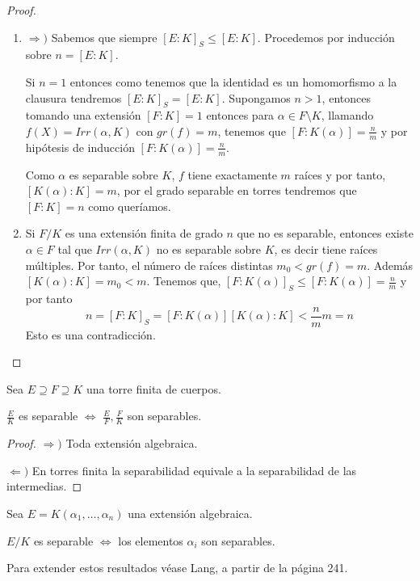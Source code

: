 \begin{proof}
\begin{enumerate}
\item $\Rightarrow)$ Sabemos que siempre $[E:K]_S \le [E:K]$. Procedemos por inducción sobre $n = [E:K]$. 

Si $n = 1$ entonces como tenemos que la identidad es un homomorfismo a la clausura tendremos $[E:K]_S = [E:K]$. Supongamos $n > 1$, entonces tomando una extensión $[F:K] = 1$ entonces para $\alpha \in F \setminus K$, llamando $f(X) = Irr(\alpha,K)$ con $gr(f) = m$, tenemos que $[F:K(\alpha)] = \frac{n}{m}$ y por hipótesis de inducción $[F:K(\alpha)] =  \frac{n}{m}$. 

Como $\alpha$ es separable sobre $K$, $f$ tiene exactamente $m$ raíces y por tanto, $[K(\alpha):K] = m$, por el grado separable en torres tendremos que $[F:K] = n$ como queríamos. 

\item Si $F/K$ es una extensión finita de grado $n$ que no es separable, entonces existe $\alpha \in F$ tal que $Irr(\alpha,K)$ no es separable sobre $K$, es decir tiene raíces múltiples. Por tanto, el número de raíces distintas $m_0 < gr(f) = m$. Además $[K(\alpha):K] = m_0 < m$. Tenemos que, $[F:K(\alpha)]_S \le [F:K(\alpha)] = \frac{n}{m}$ y por tanto $$n = [F:K]_S = [F:K(\alpha)][K(\alpha):K] < \frac{n}{m}m = n$$ Esto es una contradicción. 

\end{enumerate}

\end{proof}

\begin{proposition}
Sea $E \supseteq F \supseteq K$ una torre finita de cuerpos. 

$\frac{E}{K}$ es separable $\iff$ $\frac{E}{F},\frac{F}{K}$ son separables. 
\end{proposition}
\begin{proof}
$\Rightarrow)$ Toda extensión algebraica. 

$\Leftarrow)$ En torres finita la separabilidad equivale a la separabilidad de las intermedias. 
\end{proof}

\begin{corollary}
Sea $E = K(\alpha_1,\ldots,\alpha_n)$ una extensión algebraica. 

$E/K$ es separable $\iff$ los elementos $\alpha_i$ son separables.
\end{corollary}

Para extender estos resultados véase Lang, a partir de la página 241.




